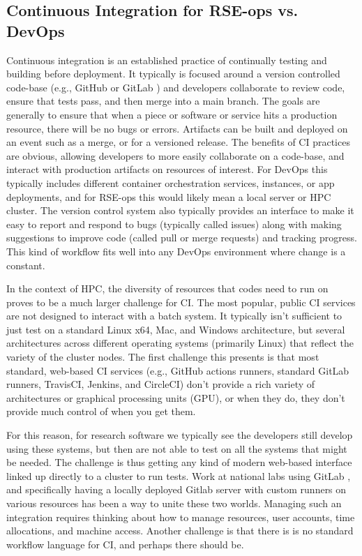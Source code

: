 \subsection{Continuous Integration for RSE-ops vs. DevOps}

Continuous integration is an established practice of continually testing and building before deployment.
It typically is focused around a version controlled code-base (e.g., GitHub or GitLab \cite{github,gitlab}) and developers collaborate to review code, ensure that tests pass, and then merge into a main branch. The goals are generally to ensure that when a piece or software or service hits a production resource, there will be no bugs or errors. Artifacts can be built and deployed on an event such as a merge, or for a versioned release. The benefits of CI practices are obvious, allowing developers to more easily collaborate on a code-base, and interact with production artifacts on resources of interest. For DevOps this typically includes different container orchestration services, instances, or app deployments, and for RSE-ops this would likely mean a local server or HPC cluster. The version control system also typically provides an interface to make it easy to report and respond to bugs (typically called issues) along with making suggestions to improve code (called pull or merge requests) and tracking progress.
This kind of workflow fits well into any DevOps environment where change is a constant.

In the context of HPC, the diversity of resources that codes need to run on proves to be a much larger challenge for CI. The most popular, public CI services are not designed to interact with a batch system. It typically isn't sufficient to just test on a standard Linux x64, Mac, and Windows architecture, but several architectures across different operating systems (primarily Linux) that reflect the variety of the cluster nodes. The first challenge this presents is that most standard, web-based CI services (e.g., GitHub actions runners, standard GitLab runners, TravisCI, Jenkins, and CircleCI) don't provide a rich variety of architectures or graphical processing units (GPU), or when they do, they don't provide much control of when you get them.

For this reason, for research software we typically see the developers still develop using these systems, but then are not able to test on all the systems that might be needed.
The challenge is thus getting any kind of modern web-based interface linked up directly to a cluster to run tests. Work at national labs using GitLab \cite{Mendoza_undated-lz,noauthor_undated-fv}, and specifically having a locally deployed Gitlab server with custom runners on various resources \cite{noauthor_undated-jd} has been a way to unite these two worlds.
Managing such an integration requires thinking about how to manage resources, user accounts, time allocations, and machine access. Another challenge is that there is is no standard workflow language for CI, and perhaps there should be.
